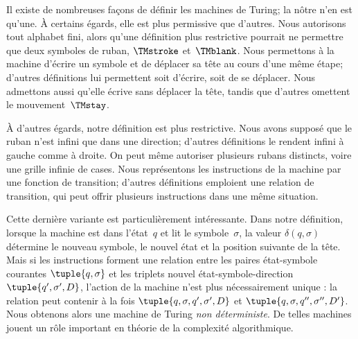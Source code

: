 \documentclass[../../../include/open-logic-section]{subfiles}
\begin{document}

Il existe de nombreuses façons de définir les machines de Turing;
la nôtre n'en est qu'une. À certains égards, elle est plus
permissive que d'autres. Nous autorisons tout alphabet fini,
alors qu'une définition plus restrictive pourrait ne permettre
que deux symboles de ruban, $\TMstroke$ et~$\TMblank$.
Nous permettons à la machine d'écrire un symbole et de déplacer
sa tête au cours d'une même étape; d'autres définitions lui
permettent soit d'écrire, soit de se déplacer. Nous admettons
aussi qu'elle écrive sans déplacer la tête, tandis que
d'autres omettent le mouvement~$\TMstay$.

À d'autres égards, notre définition est plus restrictive.
Nous avons supposé que le ruban n'est infini que dans une
direction; d'autres définitions le rendent infini à gauche
comme à droite. On peut même autoriser plusieurs rubans
distincts, voire une grille infinie de cases. Nous représentons
les instructions de la machine par une fonction de transition;
d'autres définitions emploient une relation de transition,
qui peut offrir plusieurs instructions dans une même situation.

Cette dernière variante est particulièrement intéressante.
Dans notre définition, lorsque la machine est dans l'état~$q$
et lit le symbole~$\sigma$, la valeur
$\delta(q,\sigma)$ détermine le nouveau symbole, le nouvel
état et la position suivante de la tête. Mais si les
instructions forment une relation entre les paires
état-symbole courantes $\tuple{q,\sigma}$ et les triplets
nouvel état-symbole-direction
$\tuple{q',\sigma',D}$, l'action de la machine n'est
plus nécessairement unique : la relation peut contenir
à la fois $\tuple{q,\sigma,q',\sigma',D}$ et
$\tuple{q,\sigma,q'',\sigma'',D'}$.
Nous obtenons alors une machine de Turing
\emph{non déterministe}. De telles machines jouent
un rôle important en théorie de la complexité
algorithmique.
\end{document}
